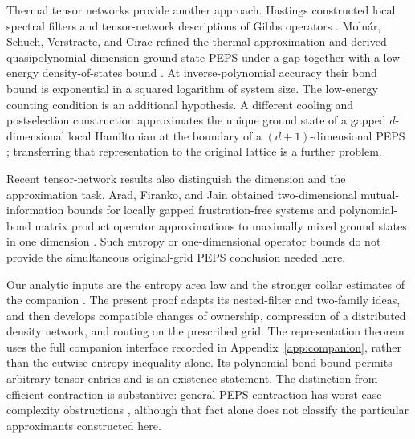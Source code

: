 Thermal tensor networks provide another approach. Hastings constructed
local spectral filters and tensor-network descriptions of Gibbs operators
\cite{Hastings2006Local}. Moln\'ar, Schuch, Verstraete, and Cirac refined the
thermal approximation and derived quasipolynomial-dimension ground-state
PEPS under a gap together with a low-energy density-of-states bound
\cite[Section~III.C]{MolnarSchuchVerstraeteCirac2015}. At inverse-polynomial
accuracy their bond bound is exponential in a squared logarithm of system
size. The low-energy counting condition is an additional hypothesis.
A different cooling and postselection construction approximates the unique
ground state of a gapped $d$-dimensional local Hamiltonian at the boundary
of a $(d+1)$-dimensional PEPS
\cite[Section~V]{SchuchWolfVerstraeteCirac2007Complexity}; transferring that
representation to the original lattice is a further problem.

Recent tensor-network results also distinguish the dimension and the
approximation task. Arad, Firanko, and Jain obtained two-dimensional
mutual-information bounds for locally gapped frustration-free systems and
polynomial-bond matrix product operator approximations to maximally mixed
ground states in one dimension
\cite[Corollaries~2.7 and~2.9]{AradFirankoJain2026}. Such entropy or
one-dimensional operator bounds do not provide the simultaneous
original-grid PEPS conclusion needed here.

Our analytic inputs are the entropy area law and the stronger collar
estimates of the companion \cite{RepoAreaLaw}. The present proof adapts its
nested-filter and two-family ideas, and then develops compatible changes
of ownership, compression of a distributed density network, and routing on
the prescribed grid. The representation theorem uses the full companion
interface recorded in Appendix~\ref{app:companion}, rather than the
cutwise entropy inequality alone. Its polynomial bond bound permits
arbitrary tensor entries and is an existence statement. The distinction
from efficient contraction is substantive: general PEPS contraction has
worst-case complexity obstructions
\cite{SchuchWolfVerstraeteCirac2007Complexity}, although that fact alone does
not classify the particular approximants constructed here.
